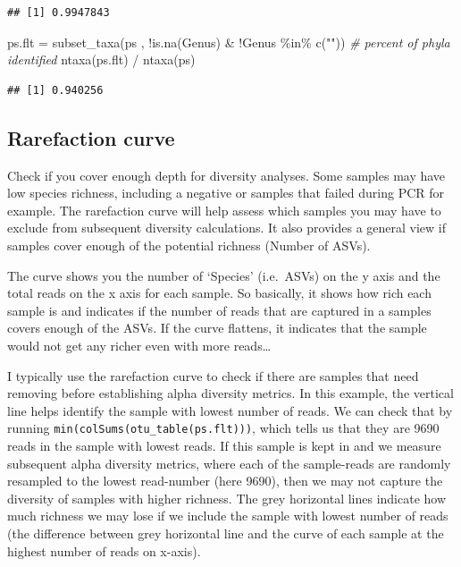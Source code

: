 \documentclass[
]{book}
\newenvironment{Shaded}{\begin{snugshade}}{\end{snugshade}}
\newcommand{\CommentTok}[1]{\textcolor[rgb]{0.56,0.35,0.01}{\textit{#1}}}
\newcommand{\FunctionTok}[1]{\textcolor[rgb]{0.00,0.00,0.00}{#1}}
\newcommand{\NormalTok}[1]{#1}
\newcommand{\OtherTok}[1]{\textcolor[rgb]{0.56,0.35,0.01}{#1}}
\newcommand{\SpecialCharTok}[1]{\textcolor[rgb]{0.00,0.00,0.00}{#1}}
\newcommand{\StringTok}[1]{\textcolor[rgb]{0.31,0.60,0.02}{#1}}
\begin{document}
\begin{verbatim}
## [1] 0.9947843
\end{verbatim}

\begin{Shaded}
\begin{Highlighting}[]
\NormalTok{ps.flt  }\OtherTok{=} \FunctionTok{subset\_taxa}\NormalTok{(ps , }\SpecialCharTok{!}\FunctionTok{is.na}\NormalTok{(Genus) }\SpecialCharTok{\&} \SpecialCharTok{!}\NormalTok{Genus }\SpecialCharTok{\%in\%} \FunctionTok{c}\NormalTok{(}\StringTok{""}\NormalTok{))}
\CommentTok{\# percent of phyla identified}
\FunctionTok{ntaxa}\NormalTok{(ps.flt) }\SpecialCharTok{/} \FunctionTok{ntaxa}\NormalTok{(ps)}
\end{Highlighting}
\end{Shaded}

\begin{verbatim}
## [1] 0.940256
\end{verbatim}

\hypertarget{rarefaction-curve}{%
\subsection{Rarefaction curve}\label{rarefaction-curve}}

Check if you cover enough depth for diversity analyses. Some samples may have low species richness, including a negative or samples that failed during PCR for example. The rarefaction curve will help assess which samples you may have to exclude from subsequent diversity calculations. It also provides a general view if samples cover enough of the potential richness (Number of ASVs).

The curve shows you the number of `Species' (i.e.~ASVs) on the y axis and the total reads on the x axis for each sample. So basically, it shows how rich each sample is and indicates if the number of reads that are captured in a samples covers enough of the ASVs. If the curve flattens, it indicates that the sample would not get any richer even with more reads\ldots{}

I typically use the rarefaction curve to check if there are samples that need removing before establishing alpha diversity metrics. In this example, the vertical line helps identify the sample with lowest number of reads. We can check that by running \texttt{min(colSums(otu\_table(ps.flt)))}, which tells us that they are 9690 reads in the sample with lowest reads. If this sample is kept in and we measure subsequent alpha diversity metrics, where each of the sample-reads are randomly resampled to the lowest read-number (here 9690), then we may not capture the diversity of samples with higher richness. The grey horizontal lines indicate how much richness we may lose if we include the sample with lowest number of reads (the difference between grey horizontal line and the curve of each sample at the highest number of reads on x-axis).
\end{document}
